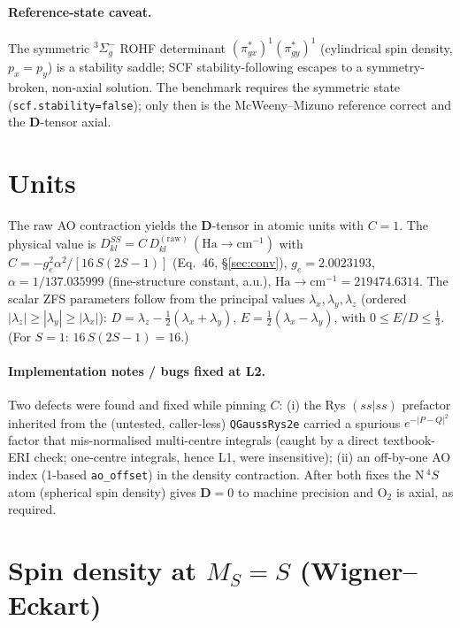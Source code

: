 \documentclass[11pt]{article}
\begin{document}
\paragraph{Reference-state caveat.} The symmetric $^3\Sigma_g^-$ ROHF determinant
$(\pi_{gx}^*)^1(\pi_{gy}^*)^1$ (cylindrical spin density, $p_x{=}p_y$) is a stability saddle; SCF
stability-following escapes to a symmetry-broken, non-axial solution. The benchmark requires the
symmetric state (\texttt{scf.stability=false}); only then is the McWeeny--Mizuno reference correct
and the $\mathbf{D}$-tensor axial.

\section{Units}\label{sec:units}
The raw AO contraction yields the $\mathbf{D}$-tensor in atomic units with $C=1$. The physical value
is $D^{SS}_{kl}=C\,D^{(\mathrm{raw})}_{kl}\,(\mathrm{Ha}\!\to\!\mathrm{cm}^{-1})$ with
$C=-g_e^2\alpha^2/[16\,S(2S-1)]$ (Eq.~46, \S\ref{sec:conv}), $g_e=2.0023193$, $\alpha=1/137.035999$
(fine-structure constant, a.u.), $\mathrm{Ha}\!\to\!\mathrm{cm}^{-1}=219474.6314$. The scalar ZFS
parameters follow from the principal values $\lambda_x,\lambda_y,\lambda_z$ (ordered
$|\lambda_z|\ge|\lambda_y|\ge|\lambda_x|$): $D=\lambda_z-\tfrac12(\lambda_x+\lambda_y)$,
$E=\tfrac12(\lambda_x-\lambda_y)$, with $0\le E/D\le \tfrac13$. (For $S=1$: $16\,S(2S-1)=16$.)

\paragraph{Implementation notes / bugs fixed at L2.} Two defects were found and fixed while pinning
$C$: (i) the Rys $(ss|ss)$ prefactor inherited from the (untested, caller-less) \texttt{QGaussRys2e}
carried a spurious $e^{-|P-Q|^2}$ factor that mis-normalised multi-centre integrals (caught by a
direct textbook-ERI check; one-centre integrals, hence L1, were insensitive); (ii) an off-by-one AO
index (1-based \texttt{ao\_offset}) in the density contraction. After both fixes the N\,${}^4S$ atom
(spherical spin density) gives $\mathbf{D}=0$ to machine precision and O$_2$ is axial, as required.

\section{Spin density at $M_S=S$ (Wigner--Eckart)}
\end{document}

